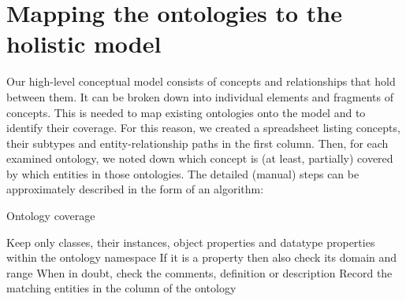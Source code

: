 
\section{Mapping the ontologies to the holistic model}
\label{section:4}


Our high-level conceptual model consists of concepts and relationships that hold between them. It can be broken down into individual elements and fragments of concepts. This is needed to map existing ontologies onto the model and to identify their coverage. For this reason, we created a spreadsheet listing concepts, their subtypes and entity-relationship paths in the first column. Then, for each examined ontology, we noted down which concept is (at least, partially) covered by which entities in those ontologies. The detailed (manual) steps can be approximately described in the form of an algorithm:

\begin{algorithm}[H]
    \caption{Ontology coverage}
    \SetAlgoLined
     {
        Keep only classes, their instances, object properties and datatype properties within the ontology namespace\;
    }
     {
        If it is a property then also check its domain and range\;
        When in doubt, check the comments, definition or description\;
        Record the matching entities in the column of the ontology\;
    }
\end{algorithm}

